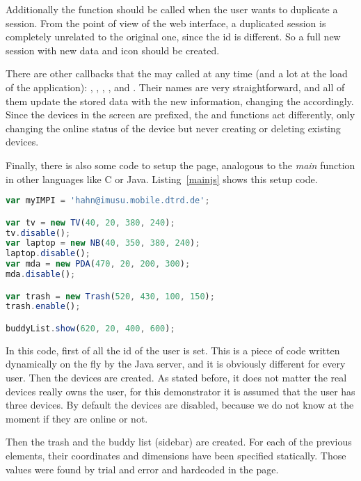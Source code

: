 Additionally the  function should be called when the user wants to duplicate a session.
From the point of view of the web interface, a duplicated session is completely unrelated to the original one, since the id is different.
So a full new session with new data and icon should be created.

There are other callbacks that the  may called at any time (and a lot at the load of the application): , , , ,  and .
Their names are very straightforward, and all of them update the stored data with the new information, changing the  accordingly.
Since the devices in the screen are prefixed, the  and  functions act differently, only changing the online status of the device but never creating or deleting existing devices.

Finally, there is also some  code to setup the page, analogous to the \emph{main} function in other languages like C or Java.
Listing~\ref{mainjs} shows this setup code.

\begin{lstlisting}[float=htbp,label=mainjs,language=javascript,caption=Setup code] % javascript
var myIMPI = 'hahn@imusu.mobile.dtrd.de';

var tv = new TV(40, 20, 380, 240);
tv.disable();
var laptop = new NB(40, 350, 380, 240);
laptop.disable();
var mda = new PDA(470, 20, 200, 300);
mda.disable();

var trash = new Trash(520, 430, 100, 150);
trash.enable();

buddyList.show(620, 20, 400, 600);
\end{lstlisting}

In this code, first of all the id of the user is set. This is a piece of code written dynamically on the fly by the Java server, and it is obviously different for every user.
Then the devices are created.
As stated before, it does not matter the real devices really owns the user, for this demonstrator it is assumed that the user has three devices.
By default the devices are disabled, because we do not know at the moment if they are online or not.

Then the trash and the buddy list (sidebar) are created.
For each of the previous elements, their coordinates and dimensions have been specified statically.
Those values were found by trial and error and hardcoded in the page.

